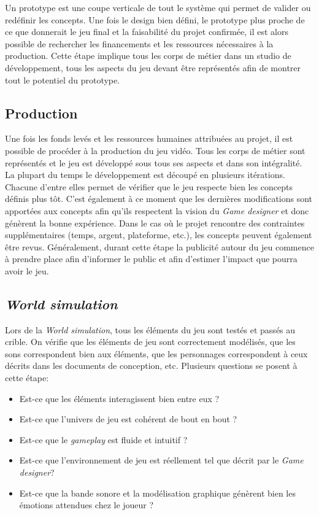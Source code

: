 Un prototype est une coupe verticale de tout le système qui permet de valider ou redéfinir les concepts.
Une fois le design bien défini, le prototype plus proche de ce que donnerait le jeu final et la faisabilité du projet confirmée, il est alors possible de rechercher les financements et les ressources nécessaires à la production.
Cette étape implique tous les corps de métier dans un studio de développement, tous les aspects du jeu devant être représentés afin de montrer tout le potentiel du prototype.

\subsection{Production}
Une fois les fonds levés et les ressources humaines attribuées au projet, il est possible de procéder à la production du jeu vidéo.
Tous les corps de métier sont représentés et le jeu est développé sous tous ses aspects et dans son intégralité.
La plupart du temps le développement est découpé en plusieurs itérations.
Chacune d'entre elles permet de vérifier que le jeu respecte bien les concepts définis plus tôt.
C'est également à ce moment que les dernières modifications sont apportées aux concepts afin qu'ils respectent la vision du \emph{Game designer} et donc génèrent la bonne expérience.
Dans le cas o\`u le projet rencontre des contraintes supplémentaires (temps, argent, plateforme, etc.), les concepts peuvent également être revus.
Généralement, durant cette étape la publicité autour du jeu commence à prendre place afin d'informer le public et afin d'estimer l'impact que pourra avoir le jeu.

\subsection{\emph{World simulation}}
Lors de la \emph{World simulation}, tous les éléments du jeu sont testés et passés au crible.
On vérifie que les éléments de jeu sont correctement modélisés, que les sons correspondent bien aux éléments, que les personnages correspondent à ceux décrits dans les documents de conception, etc.
Plusieurs questions se posent à cette \'etape:
\begin{itemize}
    \item Est-ce que les éléments interagissent bien entre eux ?
    \item Est-ce que l'univers de jeu est cohérent de bout en bout ?
    \item Est-ce que le \emph{gameplay} est fluide et intuitif ?
    \item Est-ce que l'environnement de jeu est réellement tel que décrit par le \emph{Game designer}?
    \item Est-ce que la bande sonore et la modélisation graphique génèrent bien les émotions attendues chez le joueur ?
\end{itemize}


